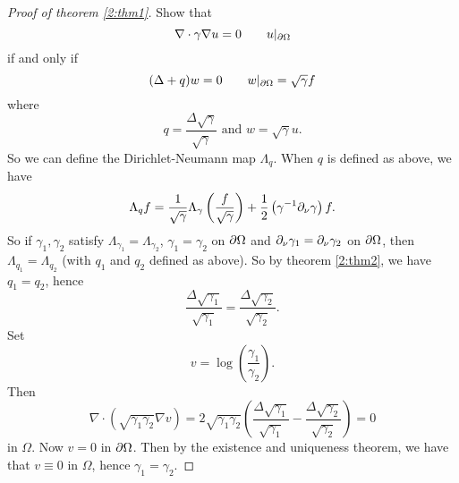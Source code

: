 \begin{proof}[Proof of theorem \ref{2:thm1}]
  Show that
  \[ \nabla \cdot \gamma \nabla u = 0 \qquad u|_{\partial\Omega} \]
  if and only if
  \[ (\Delta+q)w=0 \qquad w|_{\partial\Omega}=\sqrt{\gamma}f \]
  where
  \[ q = \frac{\Delta\sqrt{\gamma}}{\sqrt{\gamma}} \text{ and } w=\sqrt{\gamma}u. \]
  So we can define the Dirichlet-Neumann map $\Lambda_q$.
  When $q$ is defined as above, we have
  \[ \Lambda_q f = \frac{1}{\sqrt{\gamma}} \Lambda_\gamma \left( \frac{f}{\sqrt{\gamma}} \right) + \frac{1}{2} \left( \gamma^{-1} \partial_\nu \gamma \right) f. \]
  So if $\gamma_1,\gamma_2$ satisfy $\Lambda_{\gamma_1}=\Lambda_{\gamma_2}$, $\gamma_1=\gamma_2$ on $\partial\Omega$ and $\partial_\nu \gamma_1 = \partial_\nu \gamma_2$ on $\partial\Omega$, then $\Lambda_{q_1}=\Lambda_{q_2}$ (with $q_1$ and $q_2$ defined as above).
  So by theorem \ref{2:thm2}, we have $q_1=q_2$, hence
  \[ \frac{\Delta\sqrt{\gamma_1}}{\sqrt{\gamma_1}} = \frac{\Delta\sqrt{\gamma_2}}{\sqrt{\gamma_2}}. \]
  Set
  \[ v = \log \left(  \frac{\gamma_1}{\gamma_2} \right). \]
  Then
  \[ \nabla \cdot \left( \sqrt{\gamma_1\gamma_2} \nabla v \right) = 2 \sqrt{\gamma_1\gamma_2} \left( \frac{\Delta\sqrt{\gamma_1}}{\sqrt{\gamma_1}} - \frac{\Delta\sqrt{\gamma_2}}{\sqrt{\gamma_2}} \right) = 0 \]
  in $\Omega$.
  Now $v=0$ in $\partial\Omega$.
  Then by the existence and uniqueness theorem, we have that $v \equiv 0$ in $\Omega$, hence $\gamma_1=\gamma_2$.
\end{proof}

